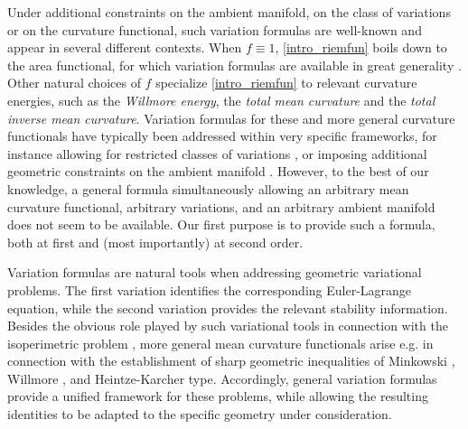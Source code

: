 \documentclass[11pt]{amsart}
\theoremstyle{definition}
\theoremstyle{remark}
\numberwithin{equation}{section}
\begin{document}
\medskip
Under additional constraints on the ambient manifold, on the class of variations or on the curvature functional, such variation formulas are well-known and appear in several different contexts. When $f\equiv 1$, \eqref{intro_riemfun} boils down to the area functional, for which variation formulas are available in great generality \cite{MR4676392}. Other natural choices of $f$ specialize \eqref{intro_riemfun} to relevant curvature energies, such as the \emph{Willmore energy}, the \emph{total mean curvature} and the \emph{total inverse mean curvature}. Variation formulas for these and more general curvature functionals have typically been addressed within very specific frameworks, for instance allowing for restricted classes of variations \cite{MR3962031,MR4927775}, or imposing additional geometric constraints on the ambient manifold \cite{MR3666332,MR3962031,MR4927775,MR341351}. However, to the best of our knowledge, a general formula simultaneously allowing an arbitrary mean curvature functional, arbitrary variations, and an arbitrary ambient manifold does not seem to be available. Our first purpose is to provide such a formula, both at first and (most importantly) at second order.

\medskip
Variation formulas are natural tools when addressing geometric variational problems. The first variation identifies the corresponding Euler-Lagrange equation, while the second variation provides the relevant stability information. Besides the obvious role played by such variational tools in connection with the isoperimetric problem \cite{MR86338,MR0731682,MR0917854,MR3921314}, more general mean curvature functionals arise e.g. in connection with the establishment of sharp geometric inequalities of Minkowski \cite{MR3544938,MR2522433,MR1511220}, Willmore \cite{MR4037467,MR4941125,MR291994,MR278240}, and Heintze-Karcher \cite{MR533065, MR1173047,MR996826,MR3702549} type. Accordingly, general variation formulas provide a unified framework for these problems, while allowing the resulting identities to be adapted to the specific geometry under consideration.
\end{document}
